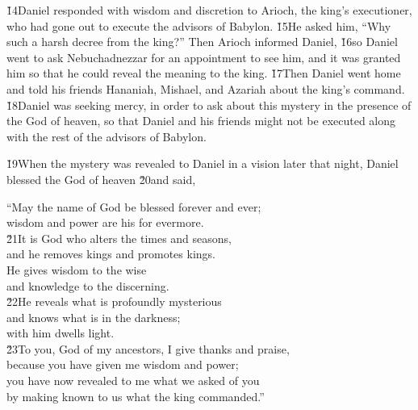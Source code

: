 \v{14}Daniel responded with wisdom and discretion to Arioch, the king's executioner, who had gone out to execute the advisors of Babylon. \v{15}He asked him, ``Why such a harsh decree from the king?'' Then Arioch informed Daniel, \v{16}so Daniel went to ask Nebuchadnezzar for an appointment to see him, and it was granted him so that he could reveal the meaning to the king. \v{17}Then Daniel went home and told his friends Hananiah, Mishael, and Azariah about the king's command. \v{18}Daniel was seeking mercy, in order to ask about this mystery in the presence of the God of heaven, so that Daniel and his friends might not be executed along with the rest of the advisors of Babylon.

\v{19}When the mystery was revealed to Daniel in a vision later that night, Daniel blessed the God of heaven \v{20}and said,

\begin{poetry}
\poeml ``May the name of God be blessed forever and ever; \\
\poemll    wisdom and power are his for evermore. \\
\poeml \v{21}It is God who alters the times and seasons, \\
\poemll    and he removes kings and promotes kings. \\
\poeml He gives wisdom to the wise \\
\poemll    and knowledge to the discerning. \\
\poeml \v{22}He reveals what is profoundly mysterious \\
\poemll    and knows what is in the darkness; \\
\poemlll       with him dwells light. \\
\poeml \v{23}To you, God of my ancestors, I give thanks and praise, \\
\poemll    because you have given me wisdom and power; \\
\poeml you have now revealed to me what we asked of you \\
\poemll    by making known to us what the king commanded.''
\end{poetry}

